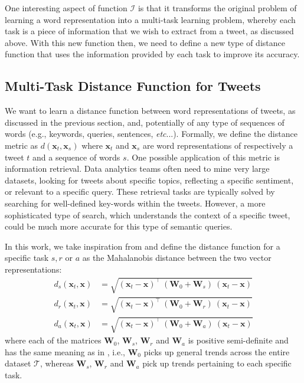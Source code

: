 \documentclass[letterpaper]{article}
\begin{document}
One interesting aspect of function $\mathcal{I}$ is that it transforms the original problem of learning a word representation into a multi-task learning problem, whereby each task is a piece of information that we wish to extract from a tweet, as discussed above. With this new function then, we need to define a new type of distance function that uses the information provided by each task to improve its accuracy.  

\subsection{Multi-Task Distance Function for Tweets}

We want to learn a distance function between word representations of tweets, as discussed in the previous section, and, potentially of any type of sequences of words (e.g., keywords, queries, sentences, \emph{etc}...). Formally, we define the distance metric as $d(\mathbf{x}_t, \mathbf{x}_s)$ where $\mathbf{x}_t$ and $\mathbf{x}_s$ are word representations of respectively a tweet $t$ and a sequence of words $s$. One possible application of this metric is information retrieval. Data analytics teams often need to mine very large datasets, looking for tweets about specific topics, reflecting a specific sentiment, or relevant to a specific query. These retrieval tasks are typically solved by searching for well-defined key-words within the tweets. However, a more sophisticated type of search, which understands the context of a specific tweet, could be much more accurate for this 
type of semantic queries. 

In this work, we take inspiration from \cite{Parameswaran2010a} and define the distance function for a specific task $s, r$ or $a$ as the Mahalanobis distance between the two vector representations: 
\begin{align}
d_{s} (\mathbf{x}_t, \mathbf{x}) &= \sqrt{  (\mathbf{x}_t - \mathbf{x})^{\intercal}\ (\mathbf{W}_0 + \mathbf{W}_s)\ (\mathbf{x}_t - \mathbf{x})}\\
d_{r} (\mathbf{x}_t, \mathbf{x}) &= \sqrt{  (\mathbf{x}_t - \mathbf{x})^{\intercal}\ (\mathbf{W}_0 + \mathbf{W}_r)\ (\mathbf{x}_t - \mathbf{x})}\\
d_{a} (\mathbf{x}_t, \mathbf{x}) &= \sqrt{  (\mathbf{x}_t - \mathbf{x})^{\intercal}\ (\mathbf{W}_0 + \mathbf{W}_a)\ (\mathbf{x}_t - \mathbf{x})}
\end{align}
where each of the matrices $\mathbf{W}_0$, $\mathbf{W}_s$, $\mathbf{W}_r$ and $\mathbf{W}_a$ is positive semi-definite and has the same meaning as in \cite{Parameswaran2010a}, i.e., $\mathbf{W}_0$ picks up general trends across the entire dataset $\mathcal{T}$, whereas $\mathbf{W}_s$, $\mathbf{W}_r$ and $\mathbf{W}_a$ pick up trends pertaining to each specific task.  
\end{document}
